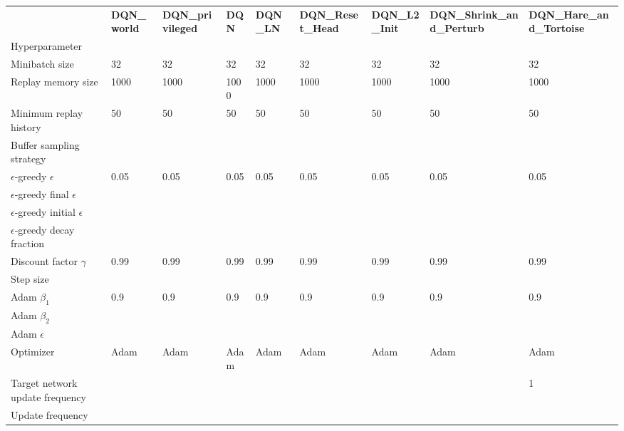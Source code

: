 \begin{tabular}{lllllllll}
 & \bfseries DQN_world & \bfseries DQN_privileged & \bfseries DQN & \bfseries DQN_LN & \bfseries DQN_Reset_Head & \bfseries DQN_L2_Init & \bfseries DQN_Shrink_and_Perturb & \bfseries DQN_Hare_and_Tortoise \\
Hyperparameter &  &  &  &  &  &  &  &  \\
Minibatch size & 32 & 32 & 32 & 32 & 32 & 32 & 32 & 32 \\
Replay memory size & 1000 & 1000 & 1000 & 1000 & 1000 & 1000 & 1000 & 1000 \\
Minimum replay history & 50 & 50 & 50 & 50 & 50 & 50 & 50 & 50 \\
Buffer sampling strategy &  &  &  &  &  &  &  &  \\
$\epsilon$-greedy $\epsilon$ & 0.05 & 0.05 & 0.05 & 0.05 & 0.05 & 0.05 & 0.05 & 0.05 \\
$\epsilon$-greedy final $\epsilon$ &  &  &  &  &  &  &  &  \\
$\epsilon$-greedy initial $\epsilon$ &  &  &  &  &  &  &  &  \\
$\epsilon$-greedy decay fraction &  &  &  &  &  &  &  &  \\
Discount factor $\gamma$ & 0.99 & 0.99 & 0.99 & 0.99 & 0.99 & 0.99 & 0.99 & 0.99 \\
Step size &  &  &  &  &  &  &  &  \\
Adam $\beta_1$ & 0.9 & 0.9 & 0.9 & 0.9 & 0.9 & 0.9 & 0.9 & 0.9 \\
Adam $\beta_2$ &  &  &  &  &  &  &  &  \\
Adam $\epsilon$ &  &  &  &  &  &  &  &  \\
Optimizer & Adam & Adam & Adam & Adam & Adam & Adam & Adam & Adam \\
Target network update frequency &  &  &  &  &  &  &  & 1 \\
Update frequency &  &  &  &  &  &  &  &  \\
\end{tabular}
